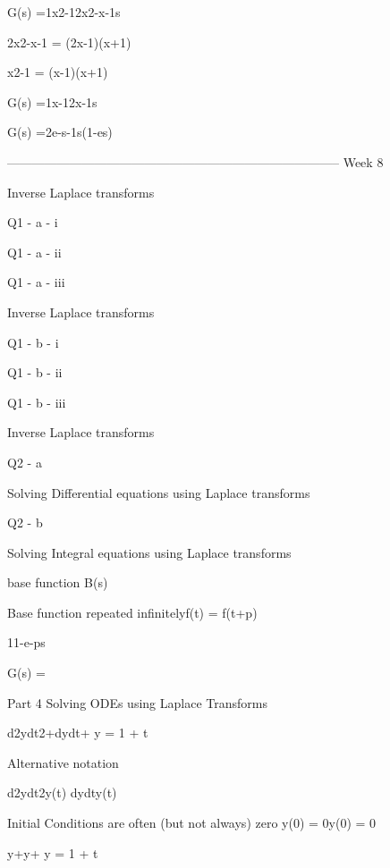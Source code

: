 G(s) =1x2-12x2-x-1s

 

2x2-x-1 = (2x-1)(x+1)

x2-1 = (x-1)(x+1)

 

 

G(s) =1x-12x-1s 

 

G(s) =2e-s-1s(1-es)

 

  



--------------------------------------------------------------------------------
Week 8


Inverse Laplace transforms


Q1 - a - i


Q1 - a - ii


Q1 - a - iii


Inverse Laplace transforms


Q1 - b - i


Q1 - b - ii


Q1 - b - iii

Inverse Laplace transforms



Q2 - a

Solving Differential equations using Laplace transforms


Q2 - b 

Solving Integral equations using Laplace transforms



base function B(s)


Base function repeated infinitelyf(t) = f(t+p)


11-e-ps


G(s)  = 


 

Part 4 Solving ODEs using Laplace Transforms 

 

d2ydt2+dydt+ y = 1 + t 

 

Alternative notation

 

d2ydt2y(t)                dydty(t)


Initial Conditions are often (but not always) zero    y(0) = 0y(0) = 0

 

 

y+y+ y = 1 + t

